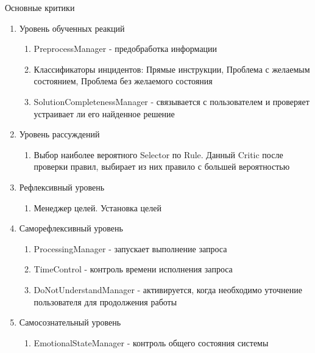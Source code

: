 Основные критики
\begin{enumerate}
	\item Уровень обученных реакций
	\begin{enumerate}
		\item PreprocessManager - предобработка информации
		\item Классификаторы инцидентов: Прямые инструкции, Проблема с желаемым состоянием, Проблема без желаемого состояния
		\item SolutionCompletenessManager - связывается с пользователем и проверяет устраивает ли его найденное решение
	\end{enumerate}
	\item Уровень рассуждений
	\begin{enumerate}
		\item Выбор наиболее вероятного Selector по Rule. Данный Critic после проверки правил, выбирает из них правило с большей вероятностью
	\end{enumerate}
	\item Рефлексивный уровень
	\begin{enumerate}
		\item Менеджер целей. Установка целей
	\end{enumerate}
	\item Саморефлексивный уровень
	\begin{enumerate}
		\item ProcessingManager - запускает выполнение запроса
		\item TimeControl - контроль времени исполнения запроса
		\item DoNotUnderstandManager - активируется, когда необходимо уточнение пользователя для продолжения работы
	\end{enumerate}
	\item Самосознательный уровень
	\begin{enumerate}
		\item EmotionalStateManager - контроль общего состояния системы
	\end{enumerate} 
\end{enumerate}
